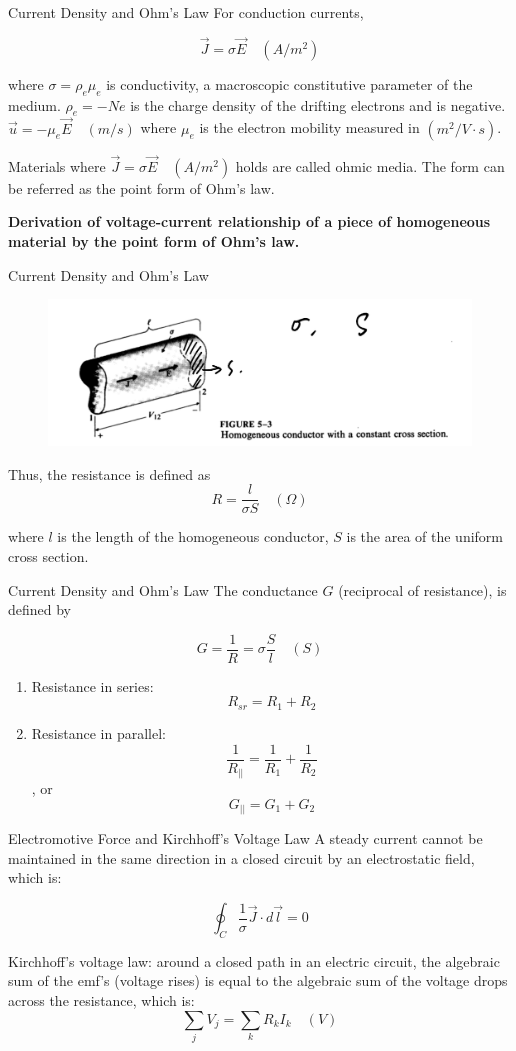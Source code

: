 \documentclass[xcolor={dvipsnames}]{beamer}
\begin{document}
\begin{frame}{Current Density and Ohm's Law}
For conduction currents,

$$
\vec{J} = \sigma \vec{E} \quad (A/m^2)
$$

where $\sigma = \rho_e\mu_e$ is conductivity, a macroscopic constitutive parameter of the medium. $\rho_e = -Ne$ is the charge density of the drifting electrons and is negative. $\vec{u} = -\mu_e \vec{E} \quad(m/s)$ where $\mu_e$ is the electron mobility measured in $(m^2/V\cdot s)$.

Materials where $
\vec{J} = \sigma \vec{E} \quad (A/m^2)
$ holds are called ohmic media. The form can be referred as the point form of Ohm's law.

\textbf{Derivation of voltage-current relationship of a piece of homogeneous material by the point form of Ohm's law.}
\end{frame}
\begin{frame}{Current Density and Ohm's Law}
\begin{figure}[H]
  \centering
  \includegraphics[width=0.7\linewidth]{5_15.png}
\end{figure}
Thus, the resistance is defined as
$$
R = \frac{l}{\sigma S} \quad (\Omega)
$$

where $l$ is the length of the homogeneous conductor, $S$ is the area of the uniform cross section.
\end{frame}
\begin{frame}{Current Density and Ohm's Law}
The conductance $G$ (reciprocal of resistance), is defined by 

$$
G=\frac{1}{R} = \sigma \frac{S}{l}\quad (S)
$$

\begin{enumerate}
  \item Resistance in series: $$R_{sr} = R_1 + R_2$$
  \item Resistance in parallel: $$\frac{1}{R_{||}} = \frac{1}{R_1} + \frac{1}{R_2}$$, or $$G_{||} = G_1+G_2$$
\end{enumerate}
\end{frame}
\begin{frame}{Electromotive Force and Kirchhoff's Voltage Law}
A steady current cannot be maintained in the same direction in a closed circuit by an electrostatic field, which is:

$$
\oint_C \frac{1}{\sigma}\vec{J}\cdot d\vec{l} = 0
$$

Kirchhoff's voltage law: around a closed path in an electric circuit, the algebraic sum of the emf's (voltage rises) is equal to the algebraic sum of the voltage drops across the resistance, which is:
$$
\sum_j V_j = \sum_k R_k I_k\quad (V)
$$
\end{frame}
\end{document}

